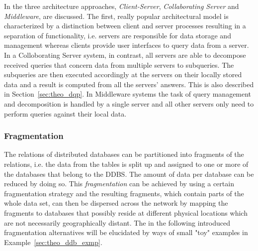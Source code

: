In \citet[p.~608f.]{Ramakrish2000} the three architecture approaches, \emph{Client-Server}, \emph{Collaborating Server} and \emph{Middleware}, are 
discussed. The first, really popular architectural model is characterized by a distinction between client and server processes resulting in a separation of
functionality, i.e. servers are responsible for data storage and management whereas clients provide user interfaces to query data from a server. In a
Colloborating Server system, in contrast, all servers are able to decompose received queries that concern data from multiple servers to subqueries. The
subqueries are then executed accordingly at the servers on their locally stored data and a result is computed from all the servers' answers. This is also
described in Section~\ref{sec:theo_dqp}. In Middleware systems the task of query management and decomposition is handled by a single server and all other
servers only need to perform queries against their local data.



\subsubsection{Fragmentation}
\label{sec:theo_ddb_frag}
The relations of distributed databases can be partitioned into fragments of the relations, i.e. the data from the tables is split up and assigned to one 
or more of the databases that belong to the DDBS. The amount of data per database can be reduced by doing so. This \emph{fragmentation} can be achieved 
by using a certain fragmentation strategy and the resulting fragments, which contain parts of the whole data set, can then be dispersed across the network
by mapping the fragments to databases that possibly reside at different physical locations which are not necessarily geographically distant. The in the
following introduced fragmentation alternatives will be elucidated by ways of small "toy" examples in Example~\ref{sec:theo_ddb_exmp}.

